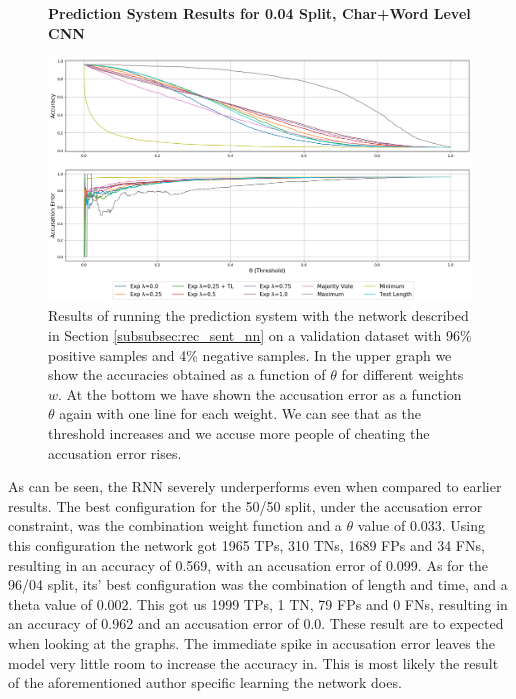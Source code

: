 \begin{figure}
    \centering
    \textbf{Prediction System Results for 0.04 Split, Char+Word Level CNN}\par\medskip
    \includegraphics[scale=0.35]{./pictures/experiments/rec_sent_nn/pred_04_rnn.png}
    \caption{Results of running the prediction system with the network described
        in Section \ref{subsubsec:rec_sent_nn} on a validation dataset
        with 96\% positive samples and 4\% negative samples. In the upper graph
        we show the accuracies obtained as a function of $\theta$ for different
        weights $w$. At the bottom we have shown the accusation error as a
        function $\theta$ again with one line for each weight. We can see that
        as the threshold increases and we accuse more people of cheating the
        accusation error rises.}
    \label{fig:rec-sent-NN-pred-4}
\end{figure}

As can be seen, the \gls{RNN} severely underperforms even when compared
to earlier results. The best configuration for the 50/50 split, under the
accusation error constraint, was the combination weight function and a $\theta$
value of 0.033. Using this configuration the network got 1965 \gls{TP}s,
310 \gls{TN}s, 1689 \gls{FP}s and 34 \gls{FN}s, resulting in an accuracy of
0.569, with an accusation error of 0.099. As for the 96/04 split, its' best
configuration was the combination of length and time, and a theta value of
0.002. This got us 1999 \gls{TP}s, 1 \gls{TN}, 79 \gls{FP}s and 0 \gls{FN}s,
resulting in an accuracy of 0.962 and an accusation error of 0.0. These result
are to expected when looking at the graphs. The immediate spike in accusation
error leaves the model very little room to increase the accuracy in. This is
most likely the result of the aforementioned author specific learning the
network does.

